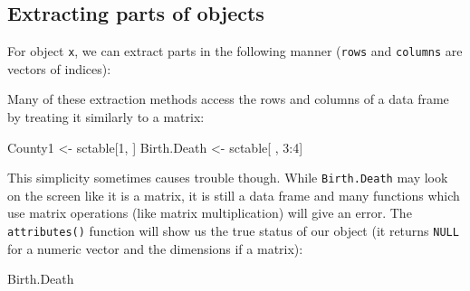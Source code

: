 \documentclass[
]{book}
\newenvironment{Shaded}{\begin{snugshade}}{\end{snugshade}}
\newcommand{\DecValTok}[1]{\textcolor[rgb]{0.00,0.00,0.81}{#1}}
\newcommand{\FunctionTok}[1]{\textcolor[rgb]{0.00,0.00,0.00}{#1}}
\newcommand{\NormalTok}[1]{#1}
\newcommand{\OtherTok}[1]{\textcolor[rgb]{0.56,0.35,0.01}{#1}}
\newcommand{\SpecialCharTok}[1]{\textcolor[rgb]{0.00,0.00,0.00}{#1}}
\newcommand{\StringTok}[1]{\textcolor[rgb]{0.31,0.60,0.02}{#1}}
\begin{document}
\hypertarget{extracting-parts-of-objects}{%
\subsection*{Extracting parts of objects}\label{extracting-parts-of-objects}}

For object \texttt{x}, we can extract parts in the following manner (\texttt{rows} and \texttt{columns} are vectors of indices):

\begin{Shaded}
\end{Shaded}

Many of these extraction methods access the rows and columns of a data frame by treating it similarly to a matrix:

\begin{Shaded}
\begin{Highlighting}[]
\NormalTok{County1 }\OtherTok{\textless{}{-}}\NormalTok{ sctable[}\DecValTok{1}\NormalTok{, ]}
\NormalTok{Birth.Death }\OtherTok{\textless{}{-}}\NormalTok{ sctable[ , }\DecValTok{3}\SpecialCharTok{:}\DecValTok{4}\NormalTok{]}
\end{Highlighting}
\end{Shaded}

This simplicity sometimes causes trouble though. While \texttt{Birth.Death} may look on the screen like it is a matrix, it is still a data frame and many functions which use matrix operations (like matrix multiplication) will give an error. The \texttt{attributes()} function will show us the true status of our object (it returns \texttt{NULL} for a numeric vector and the dimensions if a matrix):

\begin{Shaded}
\begin{Highlighting}[]
\NormalTok{Birth.Death}
\end{Highlighting}
\end{Shaded}
\end{document}
